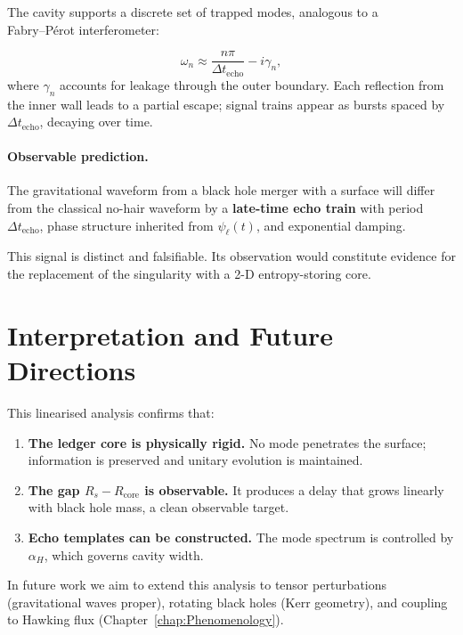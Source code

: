 \documentclass[a4paper, 12pt, oneside]{book}
\numberwithin{equation}{chapter}
\begin{document}
The cavity supports a discrete set of trapped modes, analogous to a \\ Fabry–Pérot interferometer:

\[
    \omega_n \approx \frac{n\pi}{\Delta t_{\text{echo}}} - i\gamma_n,
\]
where \( \gamma_n \) accounts for leakage through the outer boundary.
Each reflection from the inner wall leads to a partial escape; signal trains appear as bursts spaced by \( \Delta t_{\text{echo}} \), decaying over time.

\paragraph{Observable prediction.}
The gravitational waveform from a black hole merger with a surface will differ from the classical no-hair waveform by a \textbf{late-time echo train} with period \( \Delta t_{\text{echo}} \), phase structure inherited from \( \psi_{\ell}(t) \), and exponential damping.

This signal is distinct and falsifiable. Its observation would constitute evidence for the replacement of the singularity with a 2-D entropy-storing core.

\section{Interpretation and Future Directions}
\label{sec:Interpretation}

This linearised analysis confirms that:

\begin{enumerate}[label=\textbf{P\arabic*}]
  \item \textbf{The ledger core is physically rigid.}
        No mode penetrates the surface; information is preserved and unitary evolution is maintained.
  \item \textbf{The gap \( R_s - R_{\text{core}} \) is observable.}
        It produces a delay that grows linearly with black hole mass, a clean observable target.
  \item \textbf{Echo templates can be constructed.}
        The mode spectrum is controlled by \( \alpha_H \), which governs cavity width.
\end{enumerate}

In future work we aim to extend this analysis to tensor perturbations (gravitational waves proper), rotating black holes (Kerr geometry), and coupling to Hawking flux (Chapter~\ref{chap:Phenomenology}).
\end{document}
